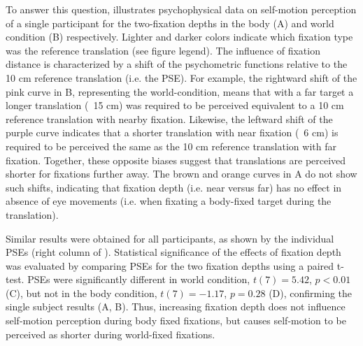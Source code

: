 To answer this question,  illustrates psychophysical data on self-motion perception of a single participant for the two-fixation depths in the body (A) and world condition (B) respectively. Lighter and darker colors indicate which fixation type was the reference translation (see figure legend). The influence of fixation distance is characterized by a shift of the psychometric functions relative to the 10 \si{\centi\metre} reference translation (i.e. the PSE). For example, the rightward shift of the pink curve in B, representing the world-condition, means that with a far target a longer translation (~15 \si{\centi\metre}) was required to be perceived equivalent to a 10 \si{\centi\metre} reference translation with nearby fixation. Likewise, the leftward shift of the purple curve indicates that a shorter translation with near fixation (~6 \si{\centi\metre}) is required to be perceived the same as the 10 \si{\centi\metre} reference translation with far fixation. Together, these opposite biases suggest that translations are perceived shorter for fixations further away. The brown and orange curves in A do not show such shifts, indicating that fixation depth (i.e. near versus far) has no effect in absence of eye movements (i.e. when fixating a body-fixed target during the translation).

Similar results were obtained for all participants, as shown by the individual PSEs (right column of ). Statistical significance of the effects of fixation depth was evaluated by comparing PSEs for the two fixation depths using a paired t-test. PSEs were significantly different in world condition, $t(7) = 5.42$, $p < 0.01$ (C), but not in the body condition, $t(7) = -1.17$, $p = 0.28$ (D), confirming the single subject results (A, B). Thus, increasing fixation depth does not influence self-motion perception during body fixed fixations, but causes self-motion to be perceived as shorter during world-fixed fixations.

